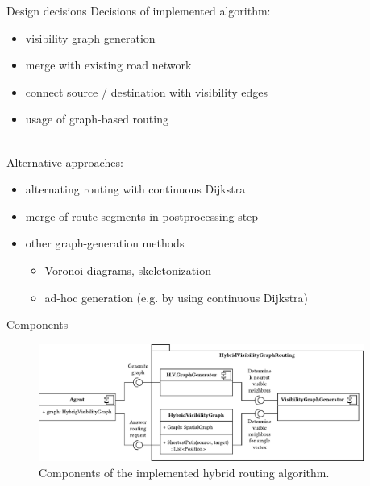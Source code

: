 \documentclass[xcolor={x11names}]{beamer}
\renewcommand{\n}{\hfill\\[0.5ex]}
\newcommand{\nn}{\hfill\\[2ex]}
\newenvironment{figcenter}
{%
	\parskip=0pt%
	\par%
	\nopagebreak%
	\centering%
}%
{%
	\par%
	\noindent%
	\ignorespacesafterend%
}
\begin{document}
		\begin{frame}{Design decisions}
			Decisions of implemented algorithm:\n
			\begin{itemize}
				\item visibility graph generation
				\item merge with existing road network
				\item connect source / destination with visibility edges
				\item usage of graph-based routing
			\end{itemize}
			\nn
			\pause
			Alternative approaches:\n
			\begin{itemize}
				\item alternating routing with continuous Dijkstra
				\item merge of route segments in postprocessing step
				\item other graph-generation methods
				\begin{itemize}
					\item Voronoi diagrams, skeletonization
					\item ad-hoc generation (e.g. by using continuous Dijkstra)
				\end{itemize}
			\end{itemize}
		\end{frame}
		
		\begin{frame}{Components}
			\begin{figure}[t]
				\begin{figcenter}
					\includegraphics[width=0.95\textwidth]{images/components.pdf}
				\end{figcenter}
				\caption{Components of the implemented hybrid routing algorithm.}
			\end{figure}
		\end{frame}
		
\end{document}
